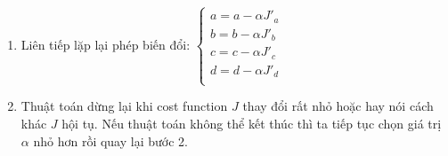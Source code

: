 \begin{itemize}
\begin{enumerate}
        \item Liên tiếp lặp lại phép biến đổi:
            $\left\{\begin{matrix}
a = a-\alpha J'_{a}\\ 
b= b-\alpha J'_{b}\\ 
c= c-\alpha J'_{c}\\ 
d= d-\alpha J'_{d}\\ 
\end{matrix}\right.$
        \item Thuật toán dừng lại khi cost function $J$ thay đổi rất nhỏ hoặc hay nói cách khác $J$ hội tụ. Nếu thuật toán không thể kết thúc thì ta tiếp tục chọn giá trị $\alpha$ nhỏ hơn rồi quay lại bước 2.
    \end{enumerate}
        

\end{itemize}
